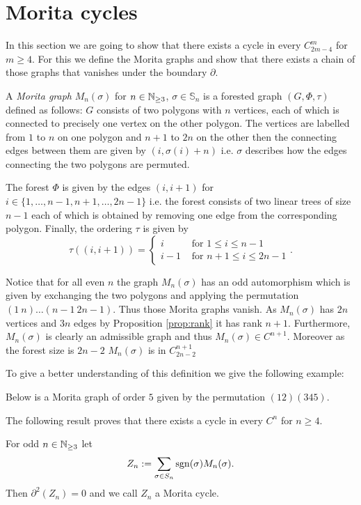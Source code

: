 \section{Morita cycles}\label{sec:MoritaClasses}
In this section we are going to show that there exists a cycle in every $C^{m}_{2m-4}$ for $m \geq 4$.
For this we define the Morita graphs and show that there exists a chain of those graphs that vanishes under the boundary $\partial$.

\begin{definition}
	A \emph{Morita graph} $M_{n}(\sigma)$ for $n \in \mathbb{N}_{\geq 3}$, $\sigma \in \mathbb{S}_{n}$ is a forested graph $(G,\Phi,\tau)$ defined as follows:
	$G$ consists of two polygons with $n$ vertices, each of which is connected to precisely one vertex on the other polygon.
	The vertices are labelled from $1$ to $n$ on one polygon and $n+1$ to $2n$ on the other then the connecting edges between them are given by $(i,\sigma(i)+n)$ i.e.
	$\sigma$ describes how the edges connecting the two polygons are permuted.

	The forest $\Phi$ is given by the edges $(i,i+1)$ for $i \in \{1,\ldots,n-1, n+1,\ldots,2n-1\}$ i.e. the
	forest consists of two linear trees of size $n-1$ each of which is obtained by removing one edge from the corresponding polygon.
	Finally, the ordering $\tau$ is given by
	\[
		\tau((i,i+1)) = \begin{cases}
			i & \text{ for } 1 \leq i \leq n-1\\ 
			i-1 & \text{ for } n+1 \leq i \leq 2n-1
		\end{cases}
	.\] 
\end{definition}
Notice that for all even $n$ the graph $M_{n}(\sigma)$ has an odd automorphism which is given by exchanging the two polygons and applying the permutation $(1\ n) \ldots (n-1\ 2n -1)$.
Thus those Morita graphs vanish.
As $M_{n}(\sigma)$ has $2n$ vertices and $3n$ edges by Proposition \ref{prop:rank} it has rank $n+1$.
Furthermore, $M_{n}(\sigma)$ is clearly an admissible graph and thus $M_{n}(\sigma) \in C^{n+1}$. Moreover as the forest size is $2n-2$ $M_{n}(\sigma)$ is in $C^{n+1}_{2n -2}$

To give a better understanding of this definition we give the following example:
\begin{eg}
	Below is a Morita graph of order $5$ given by the permutation $(12)(345)$.
\end{eg}

The following result proves that there exists a cycle in every $C^{n}$ for $n \geq 4$.
\begin{theorem}
	For odd $n \in \mathbb{N}_{\geq 3}$ let 
	\[
		Z_{n} := \sum_{\sigma \in S_{n}} \operatorname{sgn}(\sigma) M_{n}(\sigma)
	.\] 
	Then $\partial^2(Z_{n}) = 0$ and we call $Z_{n}$ a Morita cycle.
\end{theorem}

